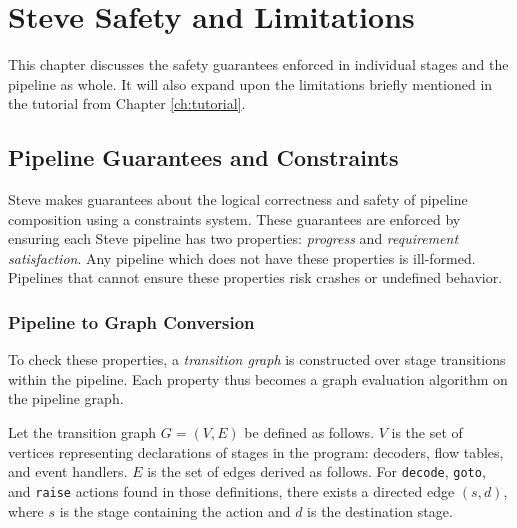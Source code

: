 \chapter{Steve Safety and Limitations} \label{ch:limits}

This chapter discusses the safety guarantees enforced in individual stages
and the pipeline as whole. It will also expand upon the limitations
briefly mentioned in the tutorial from Chapter \ref{ch:tutorial}.

\section{Pipeline Guarantees and Constraints} \label{guide:pipeline_checking}

Steve makes guarantees about the logical correctness and safety of pipeline
composition using a constraints system. These guarantees are enforced by ensuring each Steve pipeline has two properties: \textit{progress} and \textit{requirement satisfaction}. Any
pipeline which does not have these properties is ill-formed.
Pipelines that cannot ensure these properties risk crashes or undefined behavior.

\subsection{Pipeline to Graph Conversion} \label{guide:pipeline_graph}

To check these properties, a \emph{transition graph} is constructed over stage transitions within the pipeline.
Each property thus becomes a graph evaluation algorithm on the pipeline graph.

Let the transition graph $G=(V, E)$ be defined as follows. $V$ is the set of vertices representing declarations of stages in the program: decoders, flow tables, and event handlers. $E$ is the set of edges derived as follows.
For \texttt{decode}, \texttt{goto}, and \texttt{raise} actions found in those definitions, there exists a directed edge $(s, d)$, where $s$ is the stage containing the action and $d$ is the destination stage.

